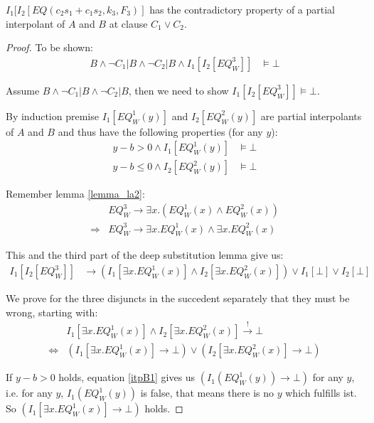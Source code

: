 \documentclass{llncs}
\begin{document}
\begin{theorem}
$I_1[I_2[EQ(c_2 s_1 + c_1 s_2, k_3, F_3)]$ has the contradictory property of a partial interpolant
of $A$ and $B$ at clause $C_1 \vee C_2$. 
\end{theorem}
\begin{proof}
To be shown: 
\begin{align*}
B\wedge\neg C_{1}|B \wedge \neg C_{2}|B \wedge I_1[I_2[EQ_W^3]] & \models \bot%
\end{align*}

Assume $B\wedge\neg C_1|B\wedge\neg C_2| B$, then we need to show $I_1[I_2[EQ_W^3]] \models \bot$.

By induction premise $I_1[EQ_W^1(y)]$ and $I_2[EQ_W^2(y)]$ are partial interpolants of $A$ and $B$ and 
thus have the following properties (for any $y$):
\begin{eqnarray}
y - b > 0 \wedge I_1[EQ_W^1(y)] & \models \bot \label{itpB1} \\
y - b \leq 0 \wedge I_2[EQ_W^2(y)] & \models \bot \label{itpB2} 
\end{eqnarray}

Remember lemma \ref{lemma_la2}:
\begin{align*}
  & EQ_W^3 \rightarrow \exists x. (EQ_W^1(x) \wedge EQ_W^2(x)) \\
  \Rightarrow & EQ_W^3 \rightarrow \exists x. EQ_W^1(x) \wedge \exists x. EQ_W^2(x)
\end{align*}

This and the third part of the deep substitution lemma give us:
\begin{align*}
I_1[I_2[EQ_W^3]] & \rightarrow (I_1[\exists x. EQ_W^1(x)] \wedge I_2[\exists x. EQ_W^2(x)]) \vee
I_1[\bot] \vee I_2[\bot]
\end{align*}

We prove for the three disjuncts in the succedent separately that they must be wrong, starting with:
\begin{align*}
& I_1[\exists x. EQ_W^1(x)] \wedge I_2[\exists x. EQ_W^2(x)] \stackrel{!}{\rightarrow} \bot \\
\Leftrightarrow & (I_1[\exists x. EQ_W^1(x)] \rightarrow \bot) \vee 
(I_2[\exists x. EQ_W^2(x)] \rightarrow \bot)
\end{align*}

If $y - b > 0$ holds, equation \ref{itpB1} gives us $(I_1(EQ_W^1(y)) \rightarrow \bot)$ for any $y$,
i.e. for any $y$, $I_1(EQ_W^1(y))$ is false, that means there is no $y$ which fulfills ist. So
$(I_1[\exists x. EQ_W^1(x)] \rightarrow \bot)$ holds. %


\end{proof}
\end{document}
